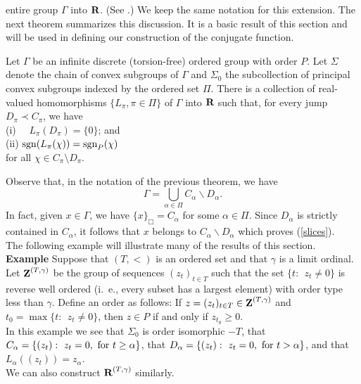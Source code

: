 entire group $\Gamma$ into $\R$.
(See \cite[Theorem A.7, p. 441]{hr1}.)
We keep the same notation for this extension.
The next 
theorem summarizes this discussion.  
It is a basic result of this section
and will be used in defining our construction
of the conjugate function.
\begin{theorem3}
Let $\Gamma$ be an infinite discrete 
(torsion-free) ordered group with order 
$P$.  Let $\Sigma$ denote the chain of 
convex subgroups of $\Gamma$ and $\Sigma_0$ 
the subcollection of principal convex 
subgroups indexed by the ordered set $\Pi$.  
There is a collection of real-valued 
homomorphisms 
$\{L_\pi, \pi\in \Pi \}$
of $\Gamma$ into $\R$ 
such that, for every jump 
$D_\pi\prec C_\pi$, 
we have \\
(i)  \ \ $ L_\pi\left( D_\pi\right)=\{0\}$; and\\
(ii) ${\rm sgn} (L_\pi(\chi))={\rm sgn}_P(\chi)$\\
for all $\chi\in C_\pi\setminus D_\pi$.
\label{theorem3}
\end{theorem3}
%
Observe that, in the notation of the previous theorem, we have 
%
%
%
\begin{equation}
\Gamma =\bigcup_{\alpha\in\Pi} C_\alpha\backslash D_\alpha.
\label{slices}
\end{equation}
%
%
%
In fact, given $x\in\Gamma$, we have 
$\{x\}_\Box=C_\alpha$ for some $\alpha\in \Pi$.  
Since $D_\alpha$ is strictly contained 
in $C_\alpha$, it follows that $x$ 
belongs to $C_\alpha\backslash 
D_\alpha$ which proves (\ref{slices}).\\
The following example will illustrate many of the results of this section.\\

{\bf  Example}  Suppose that $( T, <)$ is an
ordered set and that $\gamma$ is a limit 
ordinal.  Let $\Z^{(T,\gamma)}$ be the group
of sequences $(z_t)_{t\in T}$ such that the set 
$\{ t:\ \ z_t\neq 0\}$ is reverse well ordered (i.\ e.,
every subset has a largest element) with order type less than
$\gamma$.  Define an order as follows:  If 
$z=(z_t)_{t\in T}\in \Z^{(T,\gamma)}$ and 
$t_0=\max \{t:\ \ z_t\neq 0\}$, then $z\in P$
if and only if $z_{t_0} \ge 0$.\\
In this example we see that $\Sigma_0$
is order isomorphic $-T$, that
$C_\alpha=\{(z_t):\ z_t=0,\ {\rm for}\ t\geq\alpha\}$,
that 
$D_\alpha=\{(z_t):\ z_t=0,\ {\rm for}\ t> \alpha\}$,
and that $L_\alpha ((z_t))=z_\alpha$.\\
%
We can also construct $\R^{(T,\gamma)}$ similarly.\\



